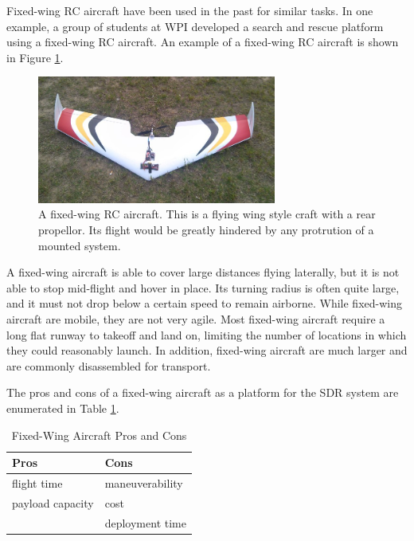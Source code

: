 Fixed-wing RC aircraft have been used in the past for similar tasks. In one example, a group of students at WPI developed a search and rescue platform using a fixed-wing RC aircraft\cite{airplane_iqp}. An example of a fixed-wing RC aircraft is shown in Figure \ref{fig:fixed_wing}.
\begin{figure}[ht]
\centering
\includegraphics[width=0.70\textwidth]{img/fixed-wing.jpg}
\caption{A fixed-wing RC aircraft. This is a flying wing style craft with a rear propellor. Its flight would be greatly hindered by any protrution of a mounted system.}
\label{fig:fixed_wing}
\end{figure}\par
A fixed-wing aircraft is able to cover large distances flying laterally, but it is not able to stop mid-flight and hover in place\cite{airplane_book}. Its turning radius is often quite large, and it must not drop below a certain speed to remain airborne. While fixed-wing aircraft are mobile, they are not very agile. Most fixed-wing aircraft require a long flat runway to takeoff and land on, limiting the number of locations in which they could reasonably launch. In addition, fixed-wing aircraft are much larger and are commonly disassembled for transport.\par
The pros and cons of a fixed-wing aircraft as a platform for the SDR system are enumerated in Table \ref{table:wing_pc}.
\begin{table}[ht]
\centering
\caption{Fixed-Wing Aircraft Pros and Cons}
\label{table:wing_pc}
\begin{tabular}{l|l}
  Pros & Cons \\ \hline
  flight time & maneuverability \\
  payload capacity & cost \\
   & deployment time \\
\end{tabular}
\end{table}\par

